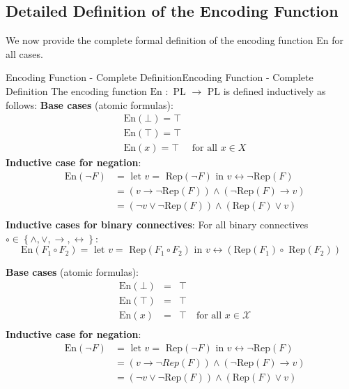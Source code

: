\documentclass[a4paper]{article}
\theoremstyle{definition}
\begin{document}
\subsection{Detailed Definition of the Encoding Function}
We now provide the complete formal definition of the encoding function En for all cases.
\begin{definition}{Encoding Function - Complete Definition}{Encoding Function - Complete Definition}
The encoding function \( \text{En } : \text{ PL } \rightarrow \text{ PL} \) is defined inductively as follows:
\vspace{1em}
\noindent
\newline 
\textbf{Base cases} (atomic formulas):
\begin{align*}
    &\text{En}(\bot) = \top \\
    &\text{En}(\top) = \top \\
    &\text{En}(x) = \top \quad \text{ for all } x \in X 
\end{align*}
\textbf{Inductive case for negation}:
\begin{align*}
    & \text{En}(\lnot F) & = \text{ let } v = \text{ Rep}(\lnot F) \text{ in } v \leftrightarrow \lnot \text{Rep}(F) \\
    & & = (v \rightarrow \lnot \text{Rep}(F)) \wedge (\lnot \text{Rep}(F) \rightarrow v)\\
    & & = (\lnot v \vee \lnot \text{Rep}(F)) \wedge (\text{Rep}(F) \vee v)\\
\end{align*}
\textbf{Inductive cases for binary connectives}:
\vspace{1em}
\noindent
\newline 
For all binary connectives \( \circ \in \left\{ \wedge, \vee, \rightarrow, \leftrightarrow \right\} \):
\[
  \text{En}(F_1 \circ F_2) = \text{ let } v = \text{ Rep}(F_1 \circ F_2) \text{ in } v \leftrightarrow (\text{Rep}(F_1) \circ \text{ Rep}(F_2))
\]
\end{definition}
\textbf{Base cases} (atomic formulas):
\begin{align*}
    & \text{En}(\bot) & = & \top \\
    & \text{En}(\top) & = & \top \\
    & \text{En}(x) & = & \top \quad \text{for all } x \in \mathcal{X} \\
\end{align*}
\textbf{Inductive case for negation}:
\begin{align*}
    & \text{En}(\lnot F) & = \text{ let } v = \text{ Rep}(\lnot F) \text{ in } v \leftrightarrow \lnot \text{Rep}(F)\\
    & & = (v \rightarrow \lnot Rep(F)) \wedge (\lnot\text{Rep}(F) \rightarrow v)\\
    & & = (\lnot v \vee \lnot \text{Rep}(F)) \wedge (\text{Rep}(F) \vee v)\\
\end{align*}
\end{document}
